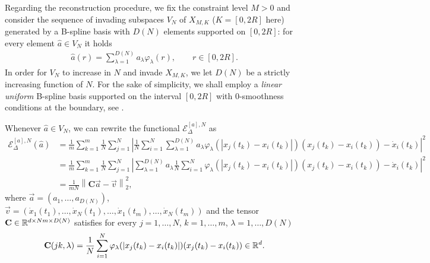 Regarding the reconstruction procedure, we fix the constraint level $M>0$ and consider the sequence of invading subspaces $V_N$ of $X_{M,K}$ ($K=[0,2 R]$ here) generated by a B-spline basis with $D(N) $ elements supported on $[0,2 R]$: for every element $\widehat{a} \in V_N$ it holds
\begin{align*}
	\widehat{a}(r) = \sum^{D(N)}_{\lambda = 1} a_{\lambda} \varphi_{\lambda}(r), \qquad r \in [0,2R].
\end{align*}
In order for $V_N$ to increase in $N$ and invade $X_{M,K}$, we let $D(N)$ be a strictly increasing function of $N$. For the sake of simplicity, we shall employ a \textit{linear uniform} B-spline basis supported on the interval $[0,2 R]$ with $0$-smoothness conditions at the boundary, see \cite{deboor}.

Whenever $\widehat{a} \in V_N$, we can rewrite the functional $\mathcal{E}^{[a],N}_\Delta$ as
\begin{align*}
\mathcal{E}^{[a],N}_\Delta(\widehat{a}) & = \frac{1}{m} \sum^m_{k = 1} \frac{1}{N} \sum^N_{j = 1} \left| \frac{1}{N} \sum^N_{i = 1} \sum^{D(N)}_{\lambda = 1} a_{\lambda} \varphi_{\lambda}(|x_j(t_k) - x_i(t_k)|)(x_j(t_k) - x_i(t_k)) - \dot{x}_i(t_k)\right|^2 \\
& = \frac{1}{m} \sum^m_{k = 1} \frac{1}{N} \sum^N_{j = 1} \left| \sum^{D(N)}_{\lambda = 1} a_{\lambda} \frac{1}{N} \sum^N_{i = 1} \varphi_{\lambda}(|x_j(t_k) - x_i(t_k)|)(x_j(t_k) - x_i(t_k)) - \dot{x}_i(t_k)\right|^2 \\
& = \frac{1}{mN} \left\| \mathbf C  \vec{a} - \vec v \right\|^2_{2},
\end{align*}
where $\vec{a} = (a_1, \ldots, a_{D(N)})$, $\vec v = (\dot{x}_1(t_1), \ldots, \dot{x}_N(t_1), \ldots,\dot{x}_1(t_m), \ldots, \dot{x}_N(t_m))$ and the tensor $\mathbf C \in \mathbb{R}^{d\times Nm \times D(N)}$ satisfies for every $j = 1, \ldots,N$, $k = 1, \ldots,m$, $\lambda = 1, \ldots,D(N)$
\begin{align*}
\mathbf C(jk,\lambda) = \frac{1}{N} \sum^N_{i = 1} \varphi_{\lambda}(|x_j(t_k) - x_i(t_k)|)(x_j(t_k) - x_i(t_k)) \in \mathbb{R}^d.
\end{align*}

